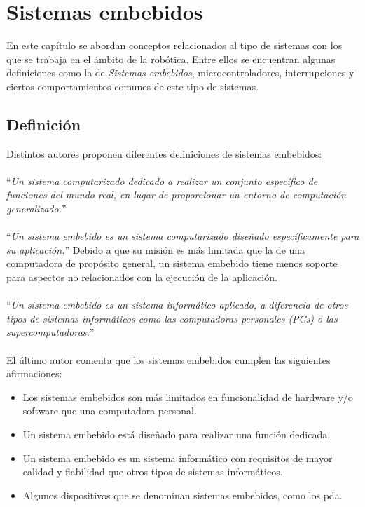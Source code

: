 \chapter{Sistemas embebidos}
\label{conceptos}

En este capítulo se abordan conceptos relacionados al tipo de sistemas con los que se trabaja en el ámbito de la robótica. Entre ellos se encuentran algunas definiciones como la de \textit{Sistemas embebidos}, microcontroladores, interrupciones y ciertos comportamientos comunes de este tipo de sistemas.


\section{Definición}
Distintos autores proponen diferentes definiciones de sistemas embebidos:
\\\\
\noindent
``\textit{Un sistema computarizado dedicado a realizar un conjunto específico de funciones del mundo real, en lugar de proporcionar un entorno de computación generalizado.}''~\cite{douglass}
\\\\
\noindent
``\textit{Un sistema embebido es un sistema computarizado diseñado específicamente para su aplicación.}'' Debido a que su misión es más limitada que la de una computadora de propósito general, un sistema embebido tiene menos soporte para aspectos no relacionados con la ejecución de la aplicación.~\cite{elecia}
\\\\
\noindent
``\textit{Un sistema embebido es un sistema informático aplicado, a diferencia de otros tipos de sistemas informáticos como las computadoras personales (PCs) o las supercomputadoras.}''~\cite{noergaard2005embedded}
\\\\
\noindent		
El último autor comenta que los sistemas embebidos cumplen las siguientes afirmaciones:
\begin{itemize}
	\item Los sistemas embebidos son más limitados en funcionalidad de hardware y/o software que una computadora personal.
	\item Un sistema embebido está diseñado para realizar una función dedicada.
	\item Un sistema embebido es un sistema informático con requisitos de mayor calidad y fiabilidad que otros tipos de sistemas informáticos.
	\item Algunos dispositivos que se denominan sistemas embebidos, como los \gls{pda}.
\end{itemize}

